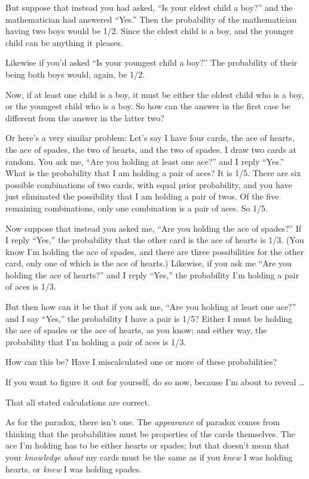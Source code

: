 {
 But suppose that instead you had asked, ``Is your
eldest child a boy?'' and the mathematician had
answered ``Yes.'' Then the
probability of the mathematician having two boys would be 1/2. Since
the eldest child is a boy, and the younger child can be anything it
pleases.}

{
 Likewise if you'd asked ``Is your
youngest child a boy?'' The probability of their
being both boys would, again, be 1/2.}

{
 Now, if at least one child is a boy, it must be either the oldest
child who is a boy, or the youngest child who is a boy. So how can the
answer in the first case be different from the answer in the latter
two?}

{
 Or here's a very similar problem:
Let's say I have four cards, the ace of hearts, the ace
of spades, the two of hearts, and the two of spades. I draw two cards
at random. You ask me, ``Are you holding at least one
ace?'' and I reply
``Yes.'' What is the probability
that I am holding a pair of aces? It is 1/5. There are six possible
combinations of two cards, with equal prior probability, and you have
just eliminated the possibility that I am holding a pair of twos. Of
the five remaining combinations, only one combination is a pair of
aces. So 1/5.}

{
 Now suppose that instead you asked me, ``Are you
holding the ace of spades?'' If I reply
``Yes,'' the probability that the
other card is the ace of hearts is 1/3. (You know I'm
holding the ace of spades, and there are three possibilities for the
other card, only one of which is the ace of hearts.) Likewise, if you
ask me ``Are you holding the ace of
hearts?'' and I reply
``Yes,'' the probability
I'm holding a pair of aces is 1/3.}

{
 But then how can it be that if you ask me, ``Are
you holding at least one ace?'' and I say
``Yes,'' the probability I have a
pair is 1/5? Either I must be holding the ace of spades or the ace of
hearts, as you know; and either way, the probability that
I'm holding a pair of aces is 1/3.}

{
 How can this be? Have I miscalculated one or more of these
probabilities?}

{
 If you want to figure it out for yourself, do so now, because
I'm about to reveal \ldots}

{
 That all stated calculations are correct.}

{
 As for the paradox, there isn't one. The
\textit{appearance} of paradox comes from thinking that the
probabilities must be properties of the cards themselves. The ace
I'm holding has to be either hearts or spades; but that
doesn't mean that your \textit{knowledge about} my
cards must be the same as if you \textit{knew} I was holding hearts, or
\textit{knew} I was holding spades.}


